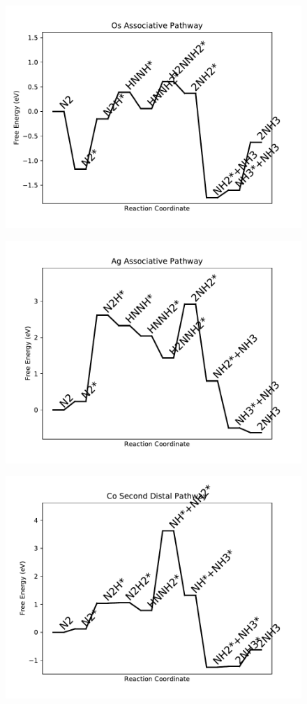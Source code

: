 \begin{figure}
\includegraphics[width=0.8\linewidth]{data/plots/Os_associative.pdf}
\end{figure}

\begin{figure}
\includegraphics[width=0.8\linewidth]{data/plots/Ag_associative.pdf}
\end{figure}

\begin{figure}
\includegraphics[width=0.8\linewidth]{data/plots/Co_distal_2.pdf}
\end{figure}

